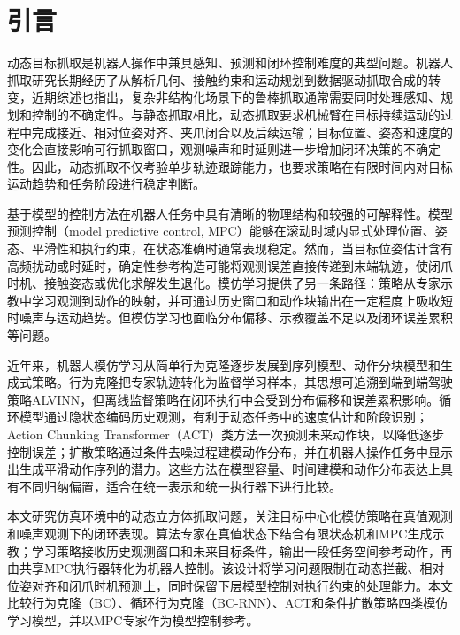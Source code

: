 \chapter{引言}\label{chap:introduction}

动态目标抓取是机器人操作中兼具感知、预测和闭环控制难度的典型问题。机器人抓取研究长期经历了从解析几何、接触约束和运动规划到数据驱动抓取合成的转变，近期综述也指出，复杂非结构化场景下的鲁棒抓取通常需要同时处理感知、规划和控制的不确定性\citep{zhang2022robotic,newbury2023deep}。与静态抓取相比，动态抓取要求机械臂在目标持续运动的过程中完成接近、相对位姿对齐、夹爪闭合以及后续运输；目标位置、姿态和速度的变化会直接影响可行抓取窗口，观测噪声和时延则进一步增加闭环决策的不确定性。因此，动态抓取不仅考验单步轨迹跟踪能力，也要求策略在有限时间内对目标运动趋势和任务阶段进行稳定判断。

基于模型的控制方法在机器人任务中具有清晰的物理结构和较强的可解释性。模型预测控制（model predictive control, MPC）能够在滚动时域内显式处理位置、姿态、平滑性和执行约束，在状态准确时通常表现稳定。然而，当目标位姿估计含有高频扰动或时延时，确定性参考构造可能将观测误差直接传递到末端轨迹，使闭爪时机、接触姿态或优化求解发生退化。模仿学习提供了另一条路径：策略从专家示教中学习观测到动作的映射，并可通过历史窗口和动作块输出在一定程度上吸收短时噪声与运动趋势。但模仿学习也面临分布偏移、示教覆盖不足以及闭环误差累积等问题。

近年来，机器人模仿学习从简单行为克隆逐步发展到序列模型、动作分块模型和生成式策略。行为克隆把专家轨迹转化为监督学习样本，其思想可追溯到端到端驾驶策略ALVINN\citep{pomerleau1989alvinn}，但离线监督策略在闭环执行中会受到分布偏移和误差累积影响\citep{ross2010efficient,ross2011reduction}。循环模型通过隐状态编码历史观测，有利于动态任务中的速度估计和阶段识别\citep{mandlekar2021matters}；Action Chunking Transformer（ACT）类方法一次预测未来动作块，以降低逐步控制误差\citep{zhao2023learning}；扩散策略通过条件去噪过程建模动作分布，并在机器人操作任务中显示出生成平滑动作序列的潜力\citep{ho2020denoising,song2020denoising,chi2023diffusion}。这些方法在模型容量、时间建模和动作分布表达上具有不同归纳偏置，适合在统一表示和统一执行器下进行比较。

本文研究仿真环境中的动态立方体抓取问题，关注目标中心化模仿策略在真值观测和噪声观测下的闭环表现。算法专家在真值状态下结合有限状态机和MPC生成示教；学习策略接收历史观测窗口和未来目标条件，输出一段任务空间参考动作，再由共享MPC执行器转化为机器人控制。该设计将学习问题限制在动态拦截、相对位姿对齐和闭爪时机预测上，同时保留下层模型控制对执行约束的处理能力。本文比较行为克隆（BC）、循环行为克隆（BC-RNN）、ACT和条件扩散策略四类模仿学习模型，并以MPC专家作为模型控制参考。

